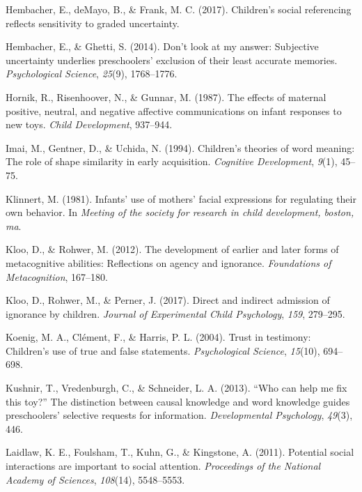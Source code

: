 \documentclass[,man,floatsintext]{apa6}
\begin{document}
\leavevmode\hypertarget{ref-hembacherchildren}{}%
Hembacher, E., deMayo, B., \& Frank, M. C. (2017). Children's social referencing reflects sensitivity to graded uncertainty.

\leavevmode\hypertarget{ref-hembacher2014don}{}%
Hembacher, E., \& Ghetti, S. (2014). Don't look at my answer: Subjective uncertainty underlies preschoolers' exclusion of their least accurate memories. \emph{Psychological Science}, \emph{25}(9), 1768--1776.

\leavevmode\hypertarget{ref-hornik1987effects}{}%
Hornik, R., Risenhoover, N., \& Gunnar, M. (1987). The effects of maternal positive, neutral, and negative affective communications on infant responses to new toys. \emph{Child Development}, 937--944.

\leavevmode\hypertarget{ref-imai1994children}{}%
Imai, M., Gentner, D., \& Uchida, N. (1994). Children's theories of word meaning: The role of shape similarity in early acquisition. \emph{Cognitive Development}, \emph{9}(1), 45--75.

\leavevmode\hypertarget{ref-klinnert1981infants}{}%
Klinnert, M. (1981). Infants' use of mothers' facial expressions for regulating their own behavior. In \emph{Meeting of the society for research in child development, boston, ma}.

\leavevmode\hypertarget{ref-kloo2012development}{}%
Kloo, D., \& Rohwer, M. (2012). The development of earlier and later forms of metacognitive abilities: Reflections on agency and ignorance. \emph{Foundations of Metacognition}, 167--180.

\leavevmode\hypertarget{ref-kloo2017direct}{}%
Kloo, D., Rohwer, M., \& Perner, J. (2017). Direct and indirect admission of ignorance by children. \emph{Journal of Experimental Child Psychology}, \emph{159}, 279--295.

\leavevmode\hypertarget{ref-koenig2004trust}{}%
Koenig, M. A., Clément, F., \& Harris, P. L. (2004). Trust in testimony: Children's use of true and false statements. \emph{Psychological Science}, \emph{15}(10), 694--698.

\leavevmode\hypertarget{ref-kushnir2013can}{}%
Kushnir, T., Vredenburgh, C., \& Schneider, L. A. (2013). ``Who can help me fix this toy?'' The distinction between causal knowledge and word knowledge guides preschoolers' selective requests for information. \emph{Developmental Psychology}, \emph{49}(3), 446.

\leavevmode\hypertarget{ref-laidlaw2011potential}{}%
Laidlaw, K. E., Foulsham, T., Kuhn, G., \& Kingstone, A. (2011). Potential social interactions are important to social attention. \emph{Proceedings of the National Academy of Sciences}, \emph{108}(14), 5548--5553.
\end{document}
